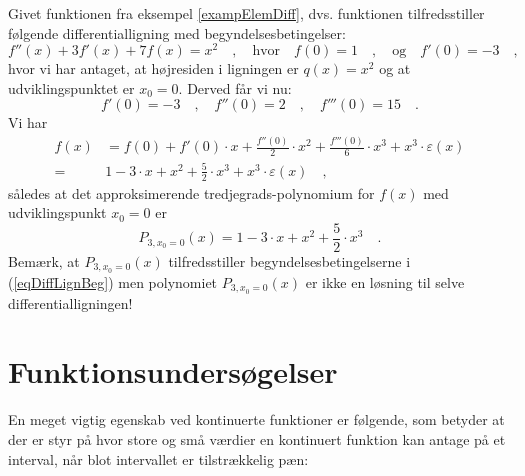 \begin{example} \label{exampRestVurdering2}
Givet funktionen fra eksempel \ref{exampElemDiff}, dvs. funktionen tilfredsstiller følgende differentialligning med begyndelsesbetingelser:
\begin{equation} \label{eqDiffLignBeg}
f''(x) + 3f'(x) + 7f(x) = x^{2} \quad , \quad \textrm{hvor} \quad f(0) = 1 \quad , \quad \textrm{og} \quad f'(0) = -3 \quad,
\end{equation}
hvor vi har antaget, at højresiden i ligningen er $q(x)=x^{2}$ og at udviklingspunktet er $x_{0}=0$. Derved får vi nu:
\begin{equation}
f'(0) = -3 \quad , \quad  f''(0)= 2 \quad , \quad  f'''(0)= 15 \quad .
\end{equation}
Vi har
\begin{equation}
\begin{aligned}
f(x) &= f(0) + f'(0)\cdot x + \frac{f''(0)}{2}\cdot x^2 +  \frac{f'''(0)}{6}\cdot x^3 + x^{3}\cdot \varepsilon(x) \\
=& 1 - 3\cdot x + x^{2} +  \frac{5}{2}\cdot x^{3} + x^{3}\cdot \varepsilon(x) \quad,
\end{aligned}
\end{equation}
således at det approksimerende tredjegrads-polynomium for $f(x)$ med udviklingspunkt $x_{0}=0$ er
\begin{equation}
P_{3, x_{0}=0}(x) = 1 - 3\cdot x + x^{2} +  \frac{5}{2}\cdot x^{3} \quad.
\end{equation}
Bemærk, at $P_{3, x_{0}=0}(x)$ tilfredsstiller begyndelsesbetingelserne i (\ref{eqDiffLignBeg}) men polynomiet $P_{3, x_{0}=0}(x)$ er ikke en løsning til selve differentialligningen!
\end{example}




\section{Funktionsundersøgelser} \label{secFunkUnders}

En meget vigtig egenskab ved kontinuerte funktioner er følgende, som betyder at der er styr på hvor store og små værdier en kontinuert funktion kan antage på et interval, når blot
intervallet er tilstrækkelig pæn:

